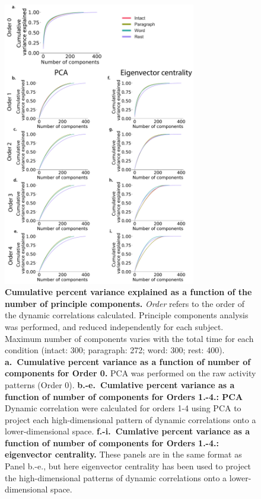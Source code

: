 \documentclass{article}
\begin{document}
\begin{figure}[p!]
\centering
\includegraphics[width=0.75\textwidth]{figs/pca}
\caption{\textbf{Cumulative percent variance explained as a function
    of the number of principle components.}  \textit{Order} refers to the order of the dynamic
    correlations calculated. Principle components analysis was
    performed, and reduced independently for each subject.  Maximum number of components varies with
    the total time for each condition (intact: 300; paragraph: 272;
    word: 300; rest: 400). \textbf{a.~Cumulative percent
    variance as a function of number of components for Order 0.} PCA
  was performed on the raw activity patterns (Order 0). \textbf{b.-e.~Cumlative percent
    variance as a function of number of components for Orders 1.-4.:
    PCA} Dynamic correlation were calculated for orders 1-4 using PCA to
    project each high-dimensional pattern of dynamic correlations onto
    a lower-dimensional space.   \textbf{f.-i.~Cumlative percent
    variance as a function of number of components for Orders 1.-4.: eigenvector centrality.} These panels are in the
    same format as Panel b.-e., but here eigenvector centrality has been
    used to project the high-dimensional patterns of dynamic
    correlations onto a lower-dimensional space. }
\label{fig:pca}
\end{figure}





\newpage
\renewcommand{\refname}{Supplementary references}

\end{document}
